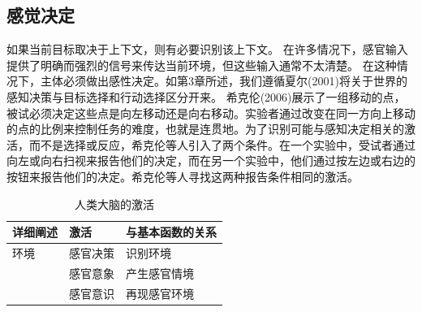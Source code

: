 \subsection{感觉决定}
\par
如果当前目标取决于上下文，则有必要识别该上下文。 在许多情况下，感官输入提供了明确而强烈的信号来传达当前环境，但这些输入通常不太清楚。 在这种情况下，主体必须做出感性决定。如第3章所述，我们遵循夏尔(2001)将关于世界的感知决策与目标选择和行动选择区分开来。
希克伦(2006)展示了一组移动的点，被试必须决定这些点是向左移动还是向右移动。实验者通过改变在同一方向上移动的点的比例来控制任务的难度，也就是连贯地。为了识别可能与感知决定相关的激活，而不是选择或反应，希克伦等人引入了两个条件。在一个实验中，受试者通过向左或向右扫视来报告他们的决定，而在另一个实验中，他们通过按左边或右边的按钮来报告他们的决定。希克伦等人寻找这两种报告条件相同的激活。
\par

\begin{table}[htbp] 
	\newcommand{\tabincell}[2]{\begin{tabular}{@{}#1@{}}#2\end{tabular}} %
	\centering
	\caption{人类大脑的激活\label{tab:9_1}}
	\renewcommand\arraystretch{1.5}	%
	\begin{tabular}{lll}
		\toprule
		详细阐述 & 激活 & 与基本函数的关系\\
		\midrule
		 环境& 感官决策 & 识别环境  \\
		 & 感官意象 & 产生感官情境 \\
		&  感官意识 & 再现感官环境\\
				\bottomrule
	
	\end{tabular}%
\end{table}%


